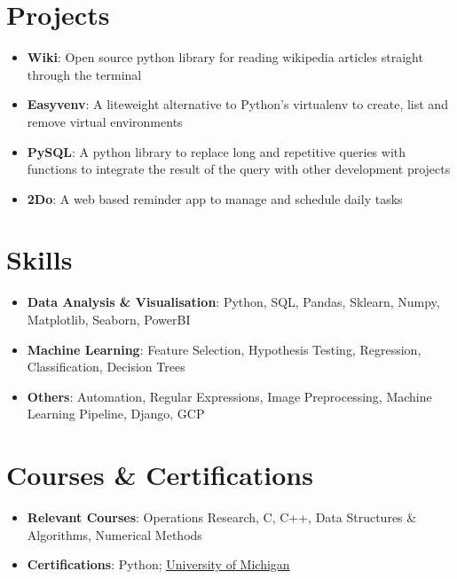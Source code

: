 \documentclass[letterpaper,11pt]{article}
\newcommand{\resumeSubHeadingListStart}{\begin{itemize}[leftmargin=*]}
\newcommand{\resumeSubHeadingListEnd}{\end{itemize}}
\begin{document}
\section{Projects}
  \resumeSubHeadingListStart
    \item{
      \textbf{Wiki}{: Open source python library for reading wikipedia articles straight through the terminal}
      \hfill
    }
    \item{
      \textbf{Easyvenv}{: A liteweight alternative to Python's virtualenv to create, list and remove virtual environments}
      \hfill
    }
    \item{
      \textbf{PySQL}{: A python library to replace long and repetitive queries with functions to integrate the result of the query with other development projects}
      \hfill
    }
    \item{
      \textbf{2Do}{: A web based reminder app to manage and schedule daily tasks}
      \hfill
    }
  \resumeSubHeadingListEnd

%
\section{Skills}
  \resumeSubHeadingListStart
    \item{
      \textbf{Data Analysis \& Visualisation}{: Python, SQL, Pandas, Sklearn, Numpy, Matplotlib, Seaborn, PowerBI}
      \hfill
    }
    \item{
      \textbf{Machine Learning}{: Feature Selection, Hypothesis Testing, Regression, Classification, Decision Trees}
      \hfill
    }
    \item{
      \textbf{Others}{: Automation, Regular Expressions, Image Preprocessing, Machine Learning Pipeline, Django, GCP}
      \hfill
    }
  \resumeSubHeadingListEnd

\section{Courses \& Certifications}
  \resumeSubHeadingListStart
    \item{
      \textbf{Relevant Courses}{: Operations Research, C, C++, Data Structures \& Algorithms, Numerical Methods}
      \hfill
    }
    \item{
      \textbf{Certifications}{: Python}; \underline{\href{https://www.coursera.org/account/accomplishments/certificate/BGRL6KFPRFAL}{University of Michigan}}
      \hfill
    }
  \resumeSubHeadingListEnd
\end{document}
